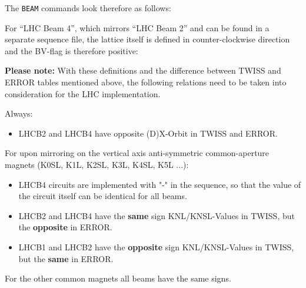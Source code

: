 The \texttt{BEAM} commands look therefore as follows:   


For ``LHC Beam 4'', which mirrors ``LHC Beam 2'' and can be found in a separate sequence file,
the lattice itself is defined in counter-clockwise direction and the BV-flag is therefore positive:


\textbf{Please note:}
With these definitions and the difference between TWISS and ERROR tables mentioned above, the following relations need to be taken into consideration for the LHC implementation.

Always:
\begin{itemize}
\item LHCB2 and LHCB4 have opposite (D)X-Orbit in TWISS and ERROR.
\end{itemize}

For upon mirroring on the vertical axis anti-symmetric common-aperture magnets (K0SL, K1L, K2SL, K3L, K4SL, K5L ...):
\begin{itemize}
  \item LHCB4 circuits are implemented with "-" in the sequence, so that the value of the circuit itself can be identical for all beams.
  \item LHCB2 and LHCB4 have the \textbf{same} sign KNL/KNSL-Values in TWISS, but the \textbf{opposite} in ERROR.
  \item LHCB1 and LHCB2 have the \textbf{opposite} sign KNL/KNSL-Values in TWISS, but the \textbf{same} in ERROR.
\end{itemize}

For the other common magnets all beams have the same signs.


